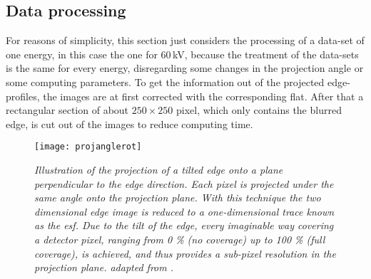 \subsection{Data processing}\label{subsec:edgeprocessing}
For reasons of simplicity, this section just considers the processing of a data-set of one energy, in this case the one for $60\,$kV, because the treatment of the data-sets is the same for every energy, disregarding some changes in the projection angle or some computing parameters. To get the information out of the projected edge-profiles, the images are at first corrected with the corresponding \gls{flat}. After that a rectangular section of about $250\times250$ pixel, which only contains the blurred edge, is cut out of the images to reduce computing time.
\begin{figure}[h]
	\begin{center}
		\texttt{[image: projanglerot]}
	\end{center}
	\caption[Illustration of the projection of an edge profile ]{\textit{Illustration of the projection of a tilted edge onto a plane perpendicular to the edge direction. Each pixel is projected under the same angle onto the projection plane. With this technique the two dimensional edge image is reduced to a one-dimensional trace known as the \gls{esf}. Due to the tilt of the edge, every imaginable way covering a detector pixel, ranging from 0 \% (no coverage) up to 100 \% (full coverage), is achieved, and thus provides a sub-pixel resolution in the projection plane. adapted from \citep{Samei1998}.}}
	\label{edgeangle}
\end{figure}
